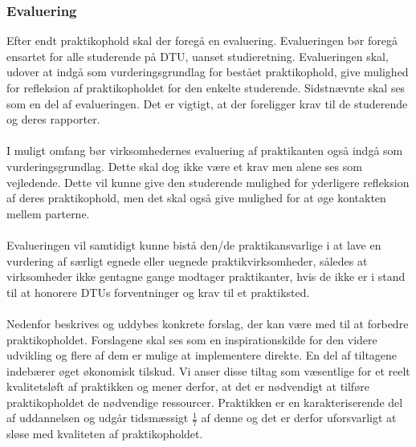 \subsubsection{Evaluering}
Efter endt praktikophold skal der foregå en evaluering. Evalueringen bør foregå ensartet for alle studerende på DTU, uanset studieretning. Evalueringen skal, udover at indgå som vurderingsgrundlag for bestået praktikophold, give mulighed for refleksion af praktikopholdet for den enkelte studerende. Sidstnævnte skal ses som en del af evalueringen. Det er vigtigt, at der foreligger krav til de studerende og deres rapporter.\\
\\
I muligt omfang bør virksomhedernes evaluering af praktikanten også indgå som vurderingsgrundlag. Dette skal dog ikke være et krav men alene ses som vejledende. Dette vil kunne give den studerende mulighed for yderligere refleksion af deres praktikophold, men det skal også give mulighed for at øge kontakten mellem parterne. \\
\\
Evalueringen vil samtidigt kunne bistå den/de praktikansvarlige i at lave en vurdering af særligt egnede eller uegnede praktikvirksomheder, således at virksomheder ikke gentagne gange modtager praktikanter, hvis de ikke er i stand til at honorere DTUs forventninger og krav til et praktiksted.\\
\\
Nedenfor beskrives og uddybes konkrete forslag, der kan være med til at forbedre praktikopholdet. Forslagene skal ses som en inspirationskilde for den videre udvikling og flere af dem er mulige at implementere direkte. En del af tiltagene indebærer øget økonomisk tilskud. Vi anser disse tiltag som væsentlige for et reelt kvalitetsløft af praktikken og mener derfor, at det er nødvendigt at tilføre praktikopholdet de nødvendige ressourcer. Praktikken er en karakteriserende del af uddannelsen og udgår tidsmæssigt $\frac{1}{7}$ af denne og det er derfor uforsvarligt at sløse med kvaliteten af praktikopholdet.


